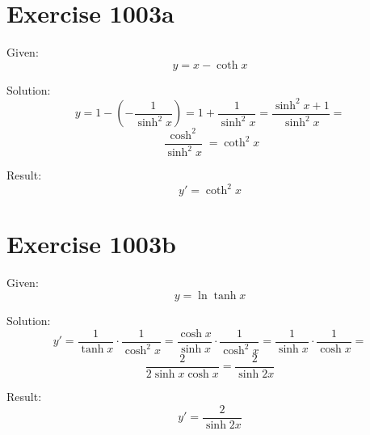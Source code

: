 \documentclass[a4paper, 10pt]{scrartcl}
\begin{document}
\section{Exercise 1003a}

Given:
\[
y = x - \coth{x}
\]

Solution:
\[
y = 1 - \left(-\frac{1}{\sinh^{2}{x}}\right) = 1 + \frac{1}{\sinh^{2}{x}} = \frac{\sinh^{2}{x} + 1}{\sinh^{2}{x}} =
\]
\[
\frac{\cosh^{2}}{\sinh^{2}{x}} = \coth^{2}{x}
\]

Result:
\[
y' = \coth^{2}{x}
\]

\section{Exercise 1003b}

Given:
\[
y = \ln{\tanh{x}}
\]

Solution:
\[
y' = \frac{1}{\tanh{x}}\cdot\frac{1}{\cosh^{2}{x}} = \frac{\cosh{x}}{\sinh{x}}\cdot\frac{1}{\cosh^{2}{x}} = \frac{1}{\sinh{x}}\cdot\frac{1}{\cosh{x}} =
\]
\[
\frac{2}{2\sinh{x}\cosh{x}} = \frac{2}{\sinh{2x}}
\]

Result:
\[
y' = \frac{2}{\sinh{2x}}
\]
\end{document}
